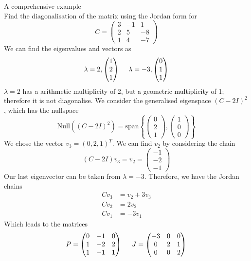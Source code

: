 \documentclass[journal, letterpaper]{IEEEtran}
\begin{document}
    \begin{myboxg}{A comprehensive example} \\
        Find the diagonalisation of the matrix using the Jordan form for 
        $$ C = \begin{pmatrix}
            3 & -1 & 1 \\ 2 & 5 & -8 \\ 1 & 4 & -7
        \end{pmatrix}$$
        We can find the eigenvalues and vectors as
        $$
        \lambda = 2, \begin{pmatrix}
            1 \\ 2 \\ 1
        \end{pmatrix} \hspace{0.45cm}
        \lambda = -3, \begin{pmatrix}
            0 \\ 1 \\ 1
        \end{pmatrix}
        $$
        $\lambda = 2$ has a arithmetic multiplicity of 2, but a geometric multiplicity of 1; therefore it is not diagonalise. We consider the generalised eigenspace $(C - 2I)^2$, which has the nullspace
        $$ \text{Null}((C - 2I)^2) = \text{span}\left\{\begin{pmatrix}
            0 \\ 2 \\ 1
        \end{pmatrix}, \begin{pmatrix}
            1 \\ 0 \\ 0
        \end{pmatrix}\right\}$$
        We chose the vector $v_3 = (0, 2, 1)^T$. We can find $v_2$ by considering the chain 
        $$ (C - 2I)v_3 = v_2 = \begin{pmatrix}
            -1 \\ -2 \\ -1
        \end{pmatrix}$$
        Our last eigenvector can be taken from $\lambda = -3$. Therefore, we have the Jordan chains
        \begin{align*}
            Cv_3 &= v_2 + 3v_3 \\ 
            Cv_2 &= 2v_2 \\
            Cv_1 &= -3v_1
        \end{align*}
        Which leads to the matrices
        $$ P = \begin{pmatrix}
            0 & -1 & 0 \\ 1 & -2 & 2 \\ 1 & -1 & 1
        \end{pmatrix} \hspace{0.5cm} J = \begin{pmatrix}
            -3 & 0 & 0 \\ 0 & 2 & 1 \\ 0 & 0 & 2
        \end{pmatrix}$$
    \end{myboxg}
\end{document}
